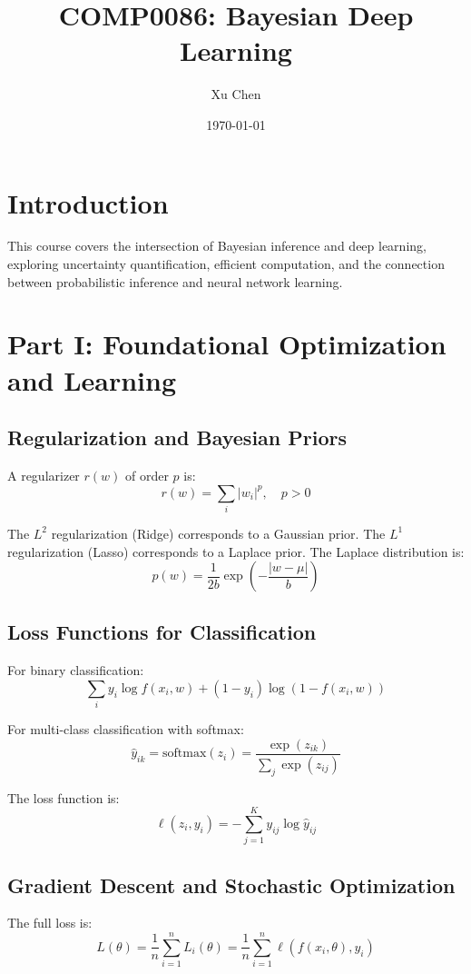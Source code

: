 \documentclass[12pt,a4paper]{article}
\title{COMP0086: Bayesian Deep Learning}
\author{Xu Chen}
\date{\today}
\theoremstyle{definition}
\begin{document}
\maketitle
\tableofcontents
\newpage

\section*{Introduction}

This course covers the intersection of Bayesian inference and deep learning, exploring uncertainty quantification, efficient computation, and the connection between probabilistic inference and neural network learning.

\newpage

\section{Part I: Foundational Optimization and Learning}

\subsection{Regularization and Bayesian Priors}

A regularizer $r(w)$ of order $p$ is:
\[
r(w) = \sum_i |w_i|^p, \quad p > 0
\]

The $L^2$ regularization (Ridge) corresponds to a Gaussian prior. The $L^1$ regularization (Lasso) corresponds to a Laplace prior. The Laplace distribution is:
\[
p(w) = \frac{1}{2b} \exp\left(-\frac{|w-\mu|}{b}\right)
\]

\subsection{Loss Functions for Classification}

For binary classification:
\[
\sum_i y_i \log f(x_i, w) + (1-y_i) \log(1 - f(x_i, w))
\]

For multi-class classification with softmax:
\[
\hat{y}_{ik} = \text{softmax}(z_i) = \frac{\exp(z_{ik})}{\sum_j \exp(z_{ij})}
\]

The loss function is:
\[
\ell(z_i, y_i) = -\sum_{j=1}^K y_{ij} \log \hat{y}_{ij}
\]

\subsection{Gradient Descent and Stochastic Optimization}

The full loss is:
\[
L(\theta) = \frac{1}{n} \sum_{i=1}^n L_i(\theta) = \frac{1}{n} \sum_{i=1}^n \ell(f(x_i, \theta), y_i)
\]
\end{document}
